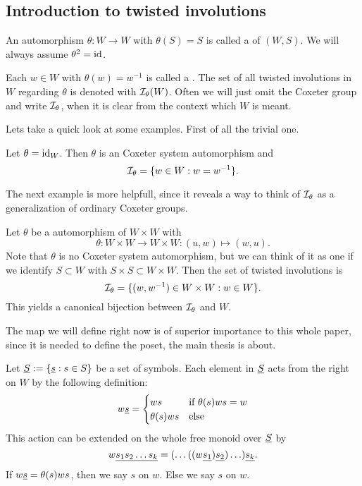 \subsection{Introduction to twisted involutions}
\label{sec:twisted-involutions-introduction}

\begin{defi}
	An automorphism $\theta : W \to W$ with $\theta(S) = S$ is called a  of $(W,S)$. We will always assume $\theta^2 = \operatorname{id}$.
\end{defi}

\begin{defi}
	Each $w \in W$ with $\theta(w) = w^{-1}$ is called a . The set of all twisted involutions in $W$ regarding $\theta$ is denoted with $\mathcal{I}_{\theta}(W)$. Often we will just omit the Coxeter group and write $\mathcal{I}_{\theta}$, when it is clear from the context which $W$ is meant.
\end{defi}

Lets take a quick look at some examples. First of all the trivial one.

\begin{exam}
	Let $\theta = \operatorname{id}_W$. Then $\theta$ is an Coxeter system automorphism and
	$$ \mathcal{I}_{\theta} = \{ w \in W : w = w^{-1} \}. $$
\end{exam}

The next example is more helpfull, since it reveals a way to think of $\mathcal{I}_{\theta}$ as a generalization of ordinary Coxeter groups.

\begin{exam}
	Let $\theta$ be a automorphism of $W \times W$ with
	$$ \theta : W \times W \to W \times W : (u,w) \mapsto (w,u). $$
	Note that $\theta$ is no Coxeter system automorphism, but we can think of it as one if we identify $S \subset W$ with $S \times S \subset W \times W$.
	Then the set of twisted involutions is
	$$ \mathcal{I}_{\theta} = \{ (w,w^{-1}) \in W \times W : w \in W \}. $$
	This yields a canonical bijection between $\mathcal{I}_{\theta}$ and $W$.
\end{exam}

The map we will define right now is of superior importance to this whole paper, since it is needed to define the poset, the main thesis is about.

\begin{defi}
	Let $\underline{S} := \{ \underline{s} : s \in S \}$ be a set of symbols. Each element in $\underline{S}$ acts from the right on $W$ by the following definition:
	$$ w \underline{s} = \begin{cases}
		ws & \textrm{if } \theta(s)ws = w \\
		\theta(s)ws & \textrm{else} \\
	\end{cases} $$
	This action can be extended on the whole free monoid over $\underline{S}$ by
	$$ w \underline{s_1 s_2 \ldots s_k} = (\ldots ((w \underline{s_1}) \underline{s_2}) \ldots) \underline{s_k}. $$
	If $w \underline{s} = \theta(s)ws$, then we say $s$  on $w$. Else we say $s$  on $w$.
\end{defi}

